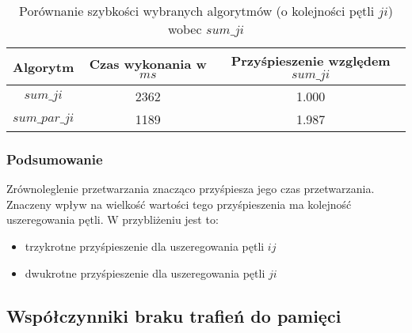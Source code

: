 \begin{table}[!ht]
\caption{Porównanie szybkości wybranych algorytmów (o kolejności pętli $ji$) wobec $sum\_ji$}
\begin{tabular}{|c|c|c|}

\hline
  Algorytm &
  Czas wykonania w $ms$ &
  Przyśpieszenie względem $sum\_ji$ \\

\hline
  $sum\_ji$ &
  2362 &
  1.000 \\

\hline
  $sum\_par\_ji$ &
  1189 &
  1.987 \\

\hline

\end{tabular}
\end{table}

\subsubsection{Podsumowanie}

Zrównoleglenie przetwarzania znacząco przyśpiesza jego czas przetwarzania. Znaczeny wpływ na wielkość wartości tego przyśpieszenia ma kolejność uszeregowania pętli. W przybliżeniu jest to:
\begin{itemize}
\item trzykrotne przyśpieszenie dla uszeregowania pętli $ij$
\item dwukrotne przyśpieszenie dla uszeregowania pętli $ji$
\end{itemize}

\subsection{Współczynniki braku trafień do pamięci}
\label{sec:trafienia}


